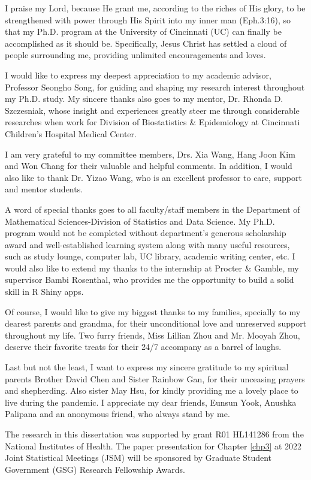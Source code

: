\documentclass{ucthesis}
\begin{document}
\begin{acknowledgements}

I praise my Lord, because He grant me, according to the riches of His glory, to be strengthened with power through His Spirit into my inner man (Eph.3:16), so that my Ph.D. program at the University of Cincinnati (UC) can finally be accomplished as it should be. Specifically, Jesus Christ has settled a cloud of people surrounding me, providing unlimited encouragements and loves.  

I would like to express my deepest appreciation to my academic advisor, Professor Seongho Song, for guiding and shaping my research interest throughout my Ph.D. study. My sincere thanks also goes to my mentor, Dr. Rhonda D. Szczesniak, whose insight and experiences greatly steer me through considerable researches when work for Division of Biostatistics \& Epidemiology at Cincinnati Children’s Hospital Medical Center.

I am very grateful to my committee members, Drs. Xia Wang, Hang Joon Kim and Won Chang for their valuable and helpful comments. In addition, I would also like to thank Dr. Yizao Wang, who is an excellent professor to care, support and mentor students.  

A word of special thanks goes to all faculty/staff members in the Department of Mathematical Sciences-Division of Statistics and Data Science.  My Ph.D. program would not be completed without department's generous scholarship award and well-established learning system along with many useful resources, such as study lounge, computer lab, UC library, academic writing center, etc. I would also like to extend my thanks to the internship at Procter \& Gamble, my supervisor Bambi Rosenthal, who provides me the opportunity to build a solid skill in R Shiny apps. 

Of course, I would like to give my biggest thanks to my families, specially to my dearest parents and grandma, for their unconditional love and unreserved support throughout my life. Two furry friends, Miss Lillian Zhou and Mr. Mooyah Zhou, deserve their favorite treats for their 24/7 accompany as a barrel of laughs. 

Last but not the least, I want to express my sincere gratitude to my spiritual parents Brother David Chen and Sister Rainbow Gan, for their unceasing prayers and shepherding. Also sister May Hsu, for kindly providing me a lovely place to live during the pandemic. I appreciate my dear friends, Eunsun Yook, Anushka Palipana and an anonymous friend, who always stand by me. 

The research in this dissertation was supported by grant R01 HL141286 from the National Institutes of Health. The paper presentation for Chapter \ref{chp3} at 2022 Joint Statistical Meetings (JSM) will be sponsored by Graduate Student Government (GSG) Research Fellowship Awards.  

\end{acknowledgements}
\end{document}
